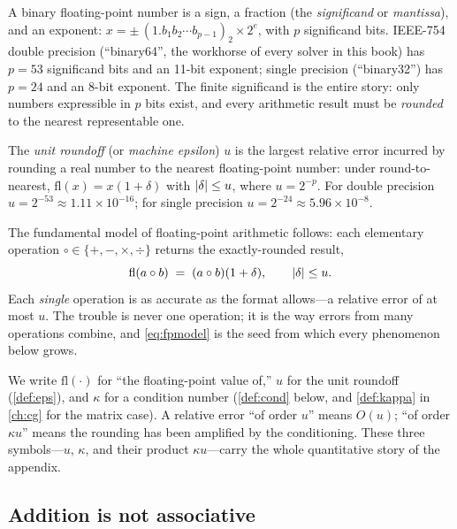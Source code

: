 A binary floating-point number is a sign, a fraction (the \emph{significand} or
\emph{mantissa}), and an exponent: $x = \pm\, (1.b_1 b_2 \cdots b_{p-1})_2 \times
2^{e}$, with $p$ significand bits. IEEE-754 double precision (``binary64'',
the workhorse of every solver in this book) has $p = 53$ significand bits and an
11-bit exponent; single precision (``binary32'') has $p = 24$ and an 8-bit
exponent. The finite significand is the entire story: only numbers expressible in
$p$ bits exist, and every arithmetic result must be \emph{rounded} to the nearest
representable one.

\begin{definition}
\label{def:eps}
The \emph{unit roundoff} (or \emph{machine epsilon}) $u$ is the largest relative
error incurred by rounding a real number to the nearest floating-point number:
under round-to-nearest, $\mathrm{fl}(x) = x(1+\delta)$ with $\lvert\delta\rvert \le u$,
where $u = 2^{-p}$. For double precision $u = 2^{-53} \approx 1.11\times10^{-16}$;
for single precision $u = 2^{-24} \approx 5.96\times10^{-8}$.
\end{definition}

The fundamental model of floating-point arithmetic follows: each elementary
operation $\circ \in \{+,-,\times,\div\}$ returns the exactly-rounded result,
\begin{equation}
\label{eq:fpmodel}
  \mathrm{fl}(a \circ b) \;=\; (a \circ b)(1 + \delta), \qquad \lvert\delta\rvert \le u .
\end{equation}
Each \emph{single} operation is as accurate as the format allows---a relative
error of at most $u$. The trouble is never one operation; it is the way errors
from many operations combine, and \eqref{eq:fpmodel} is the seed from which every
phenomenon below grows.

\begin{notationbox}
We write $\mathrm{fl}(\cdot)$ for ``the floating-point value of,'' $u$ for the unit
roundoff (\cref{def:eps}), and $\kappa$ for a condition number (\cref{def:cond}
below, and \cref{def:kappa} in \cref{ch:cg} for the matrix case). A relative error
``of order $u$'' means $O(u)$; ``of order $\kappa u$'' means the rounding has been
amplified by the conditioning. These three symbols---$u$, $\kappa$, and their
product $\kappa u$---carry the whole quantitative story of the appendix.
\end{notationbox}

\subsection{Addition is not associative}
\label{sec:nonassoc}

